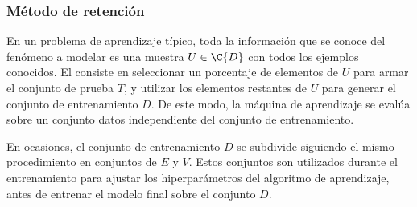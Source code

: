 %
\subsubsection{Método de retención}
\label{retencion}
%
En un problema de aprendizaje típico, toda la información que se
conoce del fenómeno a modelar es una muestra $U\in\C{D}$ con todos los
ejemplos conocidos. El  consiste en seleccionar
un porcentaje de elementos de $U$ para armar el conjunto de prueba
$T$, y utilizar los elementos restantes de $U$ para generar el
conjunto de entrenamiento $D$. De este modo, la máquina de aprendizaje
se evalúa sobre un conjunto datos independiente del conjunto de
entrenamiento.

En ocasiones, el conjunto de entrenamiento $D$ se subdivide siguiendo
el mismo procedimiento en conjuntos de  $E$ y
 $V$.  Estos conjuntos son utilizados durante el
entrenamiento para ajustar los hiperparámetros del algoritmo de
aprendizaje, antes de entrenar el modelo final sobre el conjunto $D$.
